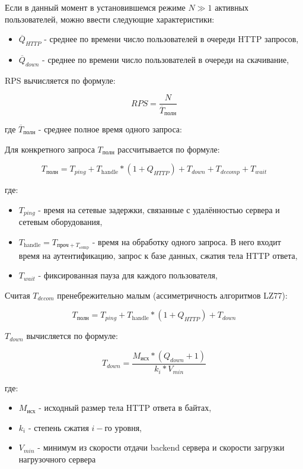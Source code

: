 \documentclass[12pt]{article}
\begin{document}
Если в данный момент в установившемся режиме $N \gg 1$ активных пользователей, можно ввести следующие характеристики:

\begin{itemize}
    \item $\overline{Q}_{HTTP}$ - среднее по времени число пользователей в очереди HTTP запросов,
    \item $\overline{Q}_{down}$ - среднее по времени число пользователей в очереди на скачивание,
\end{itemize}

RPS вычисляется по формуле:

\[
    RPS = \frac{N}{\overline{T}_{\text{полн}}}
\]

где $\overline{T}_{\text{полн}}$ - среднее полное время одного запроса:

Для конкретного запроса $T_{\text{полн}}$ рассчитывается по формуле:

\begin{equation}
    T_{\text{полн}} = T_{ping} + T_{\text{handle}}*(1 + Q_{HTTP}) + T_{down} + T_{decomp} + T_{wait}
\end{equation}

где:

\begin{itemize}
    \item $T_{ping}$ - время на сетевые задержки, связанные с удалённостью сервера и сетевым оборудования,
    \item $T_{\text{handle}} = T_{\text{проч} + T_{\text{сomp}}}$ - время на обработку одного запроса. В него входит время на аутентификацию, запрос к базе данных, сжатия тела HTTP ответа,
    \item $T_{wait}$ - фиксированная пауза для каждого пользователя,

\end{itemize}

Считая $T_{decom}$ пренебрежительно малым (ассиметричность алгоритмов LZ77):

\[
    T_{\text{полн}} = T_{ping} + T_{\text{handle}}*(1 + Q_{HTTP}) + T_{down}
\]

$T_{down}$ вычисляется по формуле:

\[
    T_{down} = \frac{M_{\text{исх}}*(Q_{down} + 1)}{k_{i}*V_{min}}
\]

где:

\begin{itemize}
    \item $M_{\text{исх}}$ - исходный размер тела HTTP ответа в байтах,
    \item $k_{i}$ - степень сжатия $i-\text{го}$ уровня,
    \item $V_{min}$ - минимум из скорости отдачи backend сервера и скорости загрузки нагрузочного сервера
\end{itemize}
\end{document}
